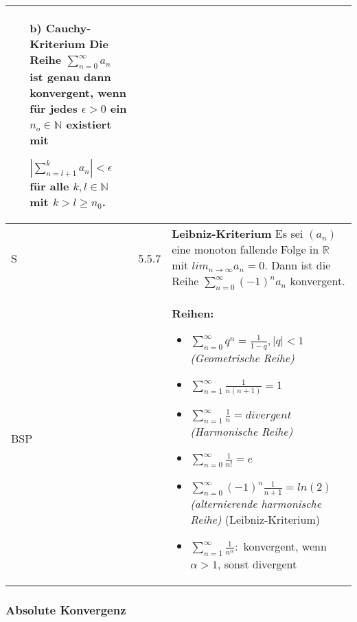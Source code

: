 \begin{longtable}{p{0.75cm} p{1cm} p{16cm}}
\begin{itemize}[topsep=-0.5cm]
                            \item[b)] \textbf{Cauchy-Kriterium} \hfill \break
                                        Die Reihe $\sum^{\infty}_{n=0} a_n$ ist genau dann konvergent, wenn für jedes $\epsilon > 0$ ein $n_o \in \mathbb{N}$
                                        existiert mit \hfill \break
                                        \centerline{$|\sum^{k}_{n=l+1} a_n| < \epsilon$ für alle $k, l \in \mathbb{N}$ mit $k > l \geq n_0$.}
                        \end{itemize} \vspace{-0cm} \\
        \midrule
        S   & 5.5.7 &   \textbf{Leibniz-Kriterium} \hfill \break
                        Es sei $(a_n)$ eine monoton fallende Folge in $\mathbb{R}$ mit $lim_{n \rightarrow \infty} a_n = 0$. Dann ist die 
                        Reihe $\sum^{\infty}_{n=0} (-1)^n a_n$ konvergent. \\
        \midrule
        BSP &      &    \textbf{Reihen:}
                        \begin{itemize}[topsep=-0.5cm]
                            \item $\sum^{\infty}_{n=0} q^n = \frac{1}{1-q}, |q| < 1$ \textit{(Geometrische Reihe)}
                            \item $\sum^{\infty}_{n=1} \frac{1}{n(n+1)} = 1$
                            \item $\sum^{\infty}_{n=1} \frac{1}{n} = divergent$ \textit{(Harmonische Reihe)}
                            \item $\sum^{\infty}_{n=0} \frac{1}{n!} = e$
                            \item $\sum^{\infty}_{n=0} (-1)^n \frac{1}{n+1} = ln(2)$ \textit{(alternierende harmonische Reihe)} (Leibniz-Kriterium)
                            \item $\sum^{\infty}_{n=1} \frac{1}{n^{\alpha}}:$ konvergent, wenn $\alpha > 1$, sonst divergent
                        \end{itemize} \vspace{-0cm} \\
        \bottomrule

    \end{longtable}

\pagebreak

\subsubsection{Absolute Konvergenz}

